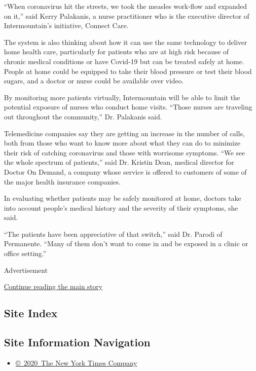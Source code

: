 ``When coronavirus hit the streets, we took the measles work-flow and
expanded on it,'' said Kerry Palakanis, a nurse practitioner who is the
executive director of Intermountain's initiative, Connect Care.

The system is also thinking about how it can use the same technology to
deliver home health care, particularly for patients who are at high risk
because of chronic medical conditions or have Covid-19 but can be
treated safely at home. People at home could be equipped to take their
blood pressure or test their blood sugars, and a doctor or nurse could
be available over video.

By monitoring more patients virtually, Intermountain will be able to
limit the potential exposure of nurses who conduct home visits. ``Those
nurses are traveling out throughout the community,'' Dr. Palakanis said.

Telemedicine companies say they are getting an increase in the number of
calls, both from those who want to know more about what they can do to
minimize their risk of catching coronavirus and those with worrisome
symptoms. ``We see the whole spectrum of patients,'' said Dr. Kristin
Dean, medical director for Doctor On Demand, a company whose service is
offered to customers of some of the major health insurance companies.

In evaluating whether patients may be safely monitored at home, doctors
take into account people's medical history and the severity of their
symptoms, she said.

``The patients have been appreciative of that switch,'' said Dr. Parodi
of Permanente. ``Many of them don't want to come in and be exposed in a
clinic or office setting.''

Advertisement

\protect\hyperlink{after-bottom}{Continue reading the main story}

\hypertarget{site-index}{%
\subsection{Site Index}\label{site-index}}

\hypertarget{site-information-navigation}{%
\subsection{Site Information
Navigation}\label{site-information-navigation}}

\begin{itemize}
\tightlist
\item
  \href{https://help.nytimes3xbfgragh.onion/hc/en-us/articles/115014792127-Copyright-notice}{©~2020~The
  New York Times Company}
\end{itemize}

